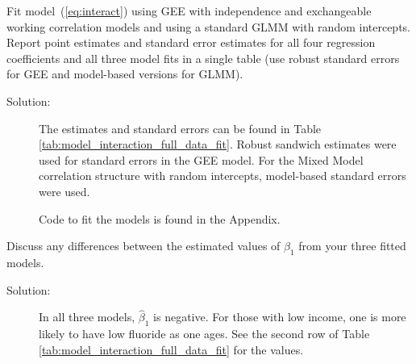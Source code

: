 \documentclass[11pt, letterpaper]{article}
\begin{document}
\begin{enumerate}[(a)]
{\em \item  Fit model~(\ref{eq:interact}) using GEE with independence and exchangeable working
correlation models and using a standard GLMM with random intercepts.  Report point estimates and standard error estimates 
for all four regression coefficients and all three model fits in a single table (use robust standard errors for GEE and model-based versions for GLMM).}

\begin{table}[ht]
  \scriptsize
  \centering
  
  \caption{Model fits of Equation \ref{eq:interact} with different correlation
    structures to the data in \texttt{fluoride.csv}.}
  \label{tab:model_interaction_full_data_fit}
\end{table}

\begin{description}
\item[Solution:] The estimates and standard errors can be found in Table
  \ref{tab:model_interaction_full_data_fit}. Robust sandwich estimates were used
  for standard errors in the GEE model. For the Mixed Model correlation
  structure with random intercepts, model-based standard errors were used.

  Code to fit the models is found in the Appendix.
\end{description}
{\em \item Discuss any differences between the estimated values of $\beta_1$ from your three fitted models.}
\begin{description}
\item[Solution:] In all three models, $\hat{\beta}_1$ is negative. For those with low
  income, one is more likely to have low fluoride as one ages. See the second
  row of Table \ref{tab:model_interaction_full_data_fit} for the values.


\end{description}
\end{enumerate}
\end{document}
